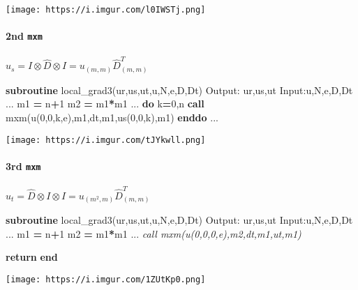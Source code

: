 \documentclass[
]{scrartcl}
\newenvironment{Shaded}{}{}
\newcommand{\CommentTok}[1]{\textcolor[rgb]{0.38,0.63,0.69}{\textit{#1}}}
\newcommand{\DecValTok}[1]{\textcolor[rgb]{0.25,0.63,0.44}{#1}}
\newcommand{\KeywordTok}[1]{\textcolor[rgb]{0.00,0.44,0.13}{\textbf{#1}}}
\newcommand{\NormalTok}[1]{#1}
\begin{document}
\texttt{[image: https://i.imgur.com/l0IWSTj.png]}

\hypertarget{nd-mxm}{%
\paragraph{\texorpdfstring{2nd \texttt{mxm}}{2nd mxm}}\label{nd-mxm}}

\(u_{s} = I \otimes \hat{D} \otimes I = u_{(m, m)} \hat{D}^T_{(m, m)}\)

\begin{Shaded}
\begin{Highlighting}[]
\KeywordTok{subroutine}\NormalTok{ local\_grad3(ur,us,ut,u,N,e,D,Dt)}
\NormalTok{Output: ur,us,ut         Input:u,N,e,D,Dt}
\NormalTok{...}
\NormalTok{m1 }\KeywordTok{=}\NormalTok{ n}\KeywordTok{+}\DecValTok{1}
\NormalTok{m2 }\KeywordTok{=}\NormalTok{ m1}\KeywordTok{*}\NormalTok{m1}
\NormalTok{...}
\KeywordTok{do}\NormalTok{ k}\KeywordTok{=}\DecValTok{0}\NormalTok{,n}
   \KeywordTok{call}\NormalTok{ mxm(u(}\DecValTok{0}\NormalTok{,}\DecValTok{0}\NormalTok{,k,e),m1,dt,m1,us(}\DecValTok{0}\NormalTok{,}\DecValTok{0}\NormalTok{,k),m1)}
\KeywordTok{enddo}
\NormalTok{...}
\end{Highlighting}
\end{Shaded}

\texttt{[image: https://i.imgur.com/tJYkwll.png]}

\hypertarget{rd-mxm}{%
\paragraph{\texorpdfstring{3rd \texttt{mxm}}{3rd mxm}}\label{rd-mxm}}

\(u_{t} = \hat{D} \otimes I \otimes I = u_{(m^2, m)} \hat{D}^T_{(m, m)}\)

\begin{Shaded}
\begin{Highlighting}[]
\KeywordTok{subroutine}\NormalTok{ local\_grad3(ur,us,ut,u,N,e,D,Dt)}
\NormalTok{Output: ur,us,ut         Input:u,N,e,D,Dt}
\NormalTok{...}
\NormalTok{m1 }\KeywordTok{=}\NormalTok{ n}\KeywordTok{+}\DecValTok{1}
\NormalTok{m2 }\KeywordTok{=}\NormalTok{ m1}\KeywordTok{*}\NormalTok{m1}
\NormalTok{...}
\CommentTok{call mxm(u(0,0,0,e),m2,dt,m1,ut,m1)}

\KeywordTok{return}
\KeywordTok{end}
\end{Highlighting}
\end{Shaded}

\texttt{[image: https://i.imgur.com/1ZUtKp0.png]}
\end{document}
